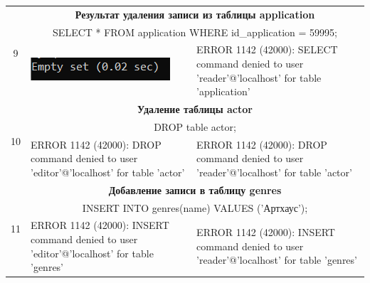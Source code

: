 \documentclass[11pt,a4paper,final]{article} %
\begin{document}
\begin{table}[H]
\begin{tabularx}{\textwidth}{|c|X|X|}
		\multirow{3}{*}{9} & \multicolumn{2}{c|}{\textbf{Результат удаления записи из таблицы application}}\\
		& \multicolumn{2}{c|}{SELECT * FROM application WHERE id\_application = 59995;} \\
		\cline{2-3}
		& 
		\vspace{-6pt}
		\hspace{-8.5pt}
		\includegraphics[width=1\linewidth]{n5.png}
		& 
		\vspace{-6pt}
		\hspace{-8.5pt}
		ERROR 1142 (42000): SELECT command denied to user 'reader'@'localhost' for table 'application'
		\\
		\cline{1-3}
		
		
		\multirow{3}{*}{10} & \multicolumn{2}{c|}{\textbf{Удаление таблицы actor}}\\
		& \multicolumn{2}{c|}{DROP table actor;} \\
		\cline{2-3}
		& 
		\vspace{-6pt}
		\hspace{-8.5pt}
		ERROR 1142 (42000): DROP command denied to user 'editor'@'localhost' for table 'actor'
		& 
		\vspace{-6pt}
		\hspace{-8.5pt}
		ERROR 1142 (42000): DROP command denied to user 'reader'@'localhost' for table 'actor'
		\\
		\cline{1-3}
		
		
		\multirow{3}{*}{11} & \multicolumn{2}{c|}{\textbf{Добавление записи в таблицу genres}}\\
		& \multicolumn{2}{c|}{INSERT INTO genres(name) VALUES ('Артхаус');} \\
		\cline{2-3}
		& 
		\vspace{-6pt}
		\hspace{-8.5pt}
		ERROR 1142 (42000): INSERT command denied to user 'editor'@'localhost' for table 'genres'
		& 
		\vspace{-6pt}
		\hspace{-8.5pt}
		ERROR 1142 (42000): INSERT command denied to user 'reader'@'localhost' for table 'genres'
		\\
		\cline{1-3}
	

\end{tabularx}
\end{table}
\end{document}
